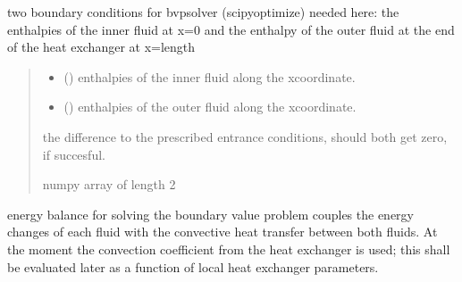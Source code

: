 \documentclass[letterpaper,10pt,english]{sphinxmanual}
\begin{document}
\begin{fulllineitems}
\begin{fulllineitems}
\label{\detokenize{heat_exchanger:heat_exchanger.counterflow_hex.bc}}
\pysigstartsignatures
{}
\pysigstopsignatures
\sphinxAtStartPar
two boundary conditions for bvp\sphinxhyphen{}solver (scipy\sphinxhyphen{}optimize) needed
here: the enthalpies of the inner fluid at x=0 and the enthalpy of
the outer fluid at the end of the heat exchanger at x=length
\begin{quote}\begin{description}
\begin{itemize}
\item {} 
\sphinxAtStartPar
{} () \textendash{} enthalpies of the inner fluid along the x\sphinxhyphen{}coordinate.

\item {} 
\sphinxAtStartPar
{} () \textendash{} enthalpies of the outer fluid along the x\sphinxhyphen{}coordinate.

\end{itemize}

\sphinxAtStartPar
the difference to the prescribed entrance conditions, should both
get zero, if succesful.

\sphinxAtStartPar
numpy array of length 2

\end{description}\end{quote}

\end{fulllineitems}


\begin{fulllineitems}
\label{\detokenize{heat_exchanger:heat_exchanger.counterflow_hex.energy}}
\pysigstartsignatures
{}
\pysigstopsignatures
\sphinxAtStartPar
energy balance for solving the boundary value problem
couples the energy changes of each fluid with the convective heat
transfer between both fluids.
At the moment the convection coefficient from the heat exchanger
is used;
this shall be evaluated later as a function of local
heat exchanger parameters.


\end{fulllineitems}
\end{fulllineitems}
\end{document}
